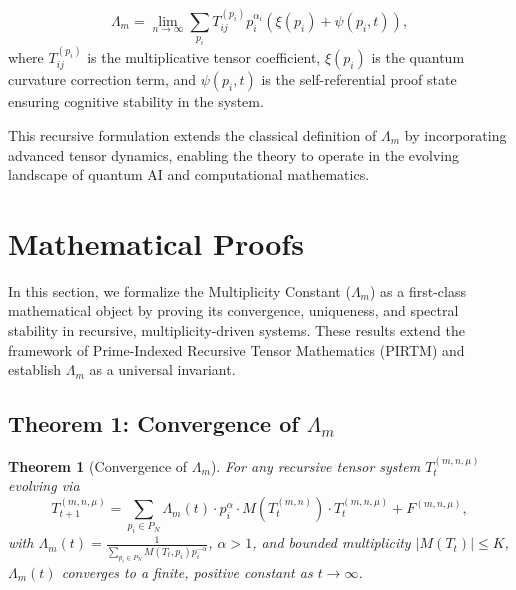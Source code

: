 \documentclass{article}
\theoremstyle{plain}
\newtheorem{theorem}{Theorem}
\begin{document}
\[
\Lambda_m = \lim_{n \to \infty} \sum_{p_i} T_{ij}^{(p_i)} p_i^{\alpha_i} \left( \xi(p_i) + \psi(p_i, t) \right),
\]
where $T_{ij}^{(p_i)}$ is the multiplicative tensor coefficient, $\xi(p_i)$ is the quantum curvature correction term, and $\psi(p_i, t)$ is the self-referential proof state ensuring cognitive stability in the system.

This recursive formulation extends the classical definition of $\Lambda_m$ by incorporating advanced tensor dynamics, enabling the theory to operate in the evolving landscape of quantum AI and computational mathematics.




\section{Mathematical Proofs}
In this section, we formalize the Multiplicity Constant (\(\Lambda_m\)) as a first-class mathematical object by proving its convergence, uniqueness, and spectral stability in recursive, multiplicity-driven systems. These results extend the framework of Prime-Indexed Recursive Tensor Mathematics (PIRTM) and establish \(\Lambda_m\) as a universal invariant.

\subsection{Theorem 1: Convergence of \(\Lambda_m\)}
\begin{theorem}[Convergence of \(\Lambda_m\)]
For any recursive tensor system \( T_t^{(m, n, \mu)} \) evolving via
\[
T_{t+1}^{(m, n, \mu)} = \sum_{p_i \in P_N} \Lambda_m(t) \cdot p_i^\alpha \cdot M(T_t^{(m, n)}) \cdot T_t^{(m, n, \mu)} + F^{(m, n, \mu)},
\]
with \(\Lambda_m(t) = \frac{1}{\sum_{p_i \in P_N} M(T_t, p_i) p_i^{-\alpha}}\), \(\alpha > 1\), and bounded multiplicity \( |M(T_t)| \leq K \), \(\Lambda_m(t)\) converges to a finite, positive constant as \( t \to \infty \).
\end{theorem}
\end{document}
